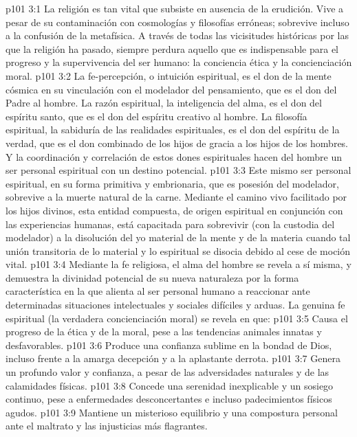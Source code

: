 \vs p101 3:1 La religión es tan vital que subsiste en ausencia de la erudición. Vive a pesar de su contaminación con cosmologías y filosofías erróneas; sobrevive incluso a la confusión de la metafísica. A través de todas las vicisitudes históricas por las que la religión ha pasado, siempre perdura aquello que es indispensable para el progreso y la supervivencia del ser humano: la conciencia ética y la concienciación moral.
\vs p101 3:2 La fe\hyp{}percepción, o intuición espiritual, es el don de la mente cósmica en su vinculación con el modelador del pensamiento, que es el don del Padre al hombre. La razón espiritual, la inteligencia del alma, es el don del espíritu santo, que es el don del espíritu creativo al hombre. La filosofía espiritual, la sabiduría de las realidades espirituales, es el don del espíritu de la verdad, que es el don combinado de los hijos de gracia a los hijos de los hombres. Y la coordinación y correlación de estos dones espirituales hacen del hombre un ser personal espiritual con un destino potencial.
\vs p101 3:3 Este mismo ser personal espiritual, en su forma primitiva y embrionaria, que es posesión del modelador, sobrevive a la muerte natural de la carne. Mediante el camino vivo facilitado por los hijos divinos, esta entidad compuesta, de origen espiritual en conjunción con las experiencias humanas, está capacitada para sobrevivir (con la custodia del modelador) a la disolución del yo material de la mente y de la materia cuando tal unión transitoria de lo material y lo espiritual se disocia debido al cese de moción vital.
\vs p101 3:4 Mediante la fe religiosa, el alma del hombre se revela a sí misma, y demuestra la divinidad potencial de su nueva naturaleza por la forma característica en la que alienta al ser personal humano a reaccionar ante determinadas situaciones intelectuales y sociales difíciles y arduas. La genuina fe espiritual (la verdadera concienciación moral) se revela en que:
\vs p101 3:5 Causa el progreso de la ética y de la moral, pese a las tendencias animales innatas y desfavorables.
\vs p101 3:6 Produce una confianza sublime en la bondad de Dios, incluso frente a la amarga decepción y a la aplastante derrota.
\vs p101 3:7 Genera un profundo valor y confianza, a pesar de las adversidades naturales y de las calamidades físicas.
\vs p101 3:8 Concede una serenidad inexplicable y un sosiego continuo, pese a enfermedades desconcertantes e incluso padecimientos físicos agudos.
\vs p101 3:9 Mantiene un misterioso equilibrio y una compostura personal ante el maltrato y las injusticias más flagrantes.
